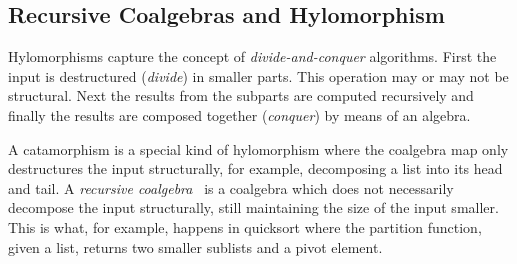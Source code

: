 \documentclass[ a4paper, UKenglish, cleveref, autoref, thm-restate]{lipics-v2021}
\begin{document}
\subsection{Recursive Coalgebras and Hylomorphism}
\label{sec:rec-coalgebras}
Hylomorphisms capture the concept of \emph{divide-and-conquer} algorithms.
First the input is destructured (\emph{divide}) in smaller parts. This
operation may or may not be structural. Next the results from the subparts are
computed recursively and finally the results are composed together
(\emph{conquer}) by means of an algebra.

A catamorphism is a special kind of hylomorphism where the coalgebra
map  only destructures the input structurally, for example,
decomposing a list into its head and tail. A \emph{recursive
coalgebra}~\cite{AdamekMM19,CaprettaUV04} is a coalgebra which does not
necessarily decompose the input structurally, still maintaining the size of the
input smaller. This is what, for example, happens in quicksort where the
partition function, given a list, returns two smaller sublists and a pivot
element.
\end{document}
